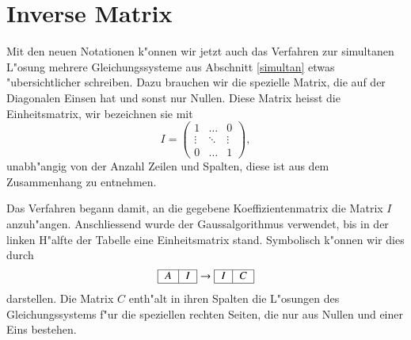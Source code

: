 \section{Inverse Matrix}
Mit den neuen Notationen k"onnen wir jetzt auch das Verfahren zur simultanen
L"osung mehrere Gleichungssysteme aus Abschnitt \ref{simultan} etwas
"ubersichtlicher schreiben. Dazu brauchen wir die spezielle Matrix, die auf
der Diagonalen Einsen hat und sonst nur Nullen. Diese Matrix heisst die
Einheitsmatrix, wir bezeichnen sie mit
$$
I=
\begin{pmatrix}1&\dots&0\\
\vdots&\ddots&\vdots\\
0&\dots&1
\end{pmatrix},
$$
unabh"angig von der Anzahl Zeilen und Spalten, diese ist aus dem Zusammenhang
zu entnehmen.

Das Verfahren begann damit, an die gegebene Koeffizientenmatrix die Matrix $I$
anzuh"angen. Anschliessend wurde der Gaussalgorithmus verwendet, bis in
der linken H"alfte der Tabelle eine Einheitsmatrix stand. Symbolisch k"onnen
wir dies durch
\begin{equation}
\begin{tabular}{|c|c|}\hline
$A$&$I$\\
\hline
\end{tabular}
\rightarrow
\begin{tabular}{|c|c|}\hline
$I$&$C$\\
\hline
\end{tabular}
\label{gaussinverse}
\end{equation}
darstellen. Die Matrix $C$ enth"alt in ihren Spalten die L"osungen des
Gleichungssystems f"ur die speziellen rechten Seiten, die nur aus Nullen
und einer Eins bestehen.

